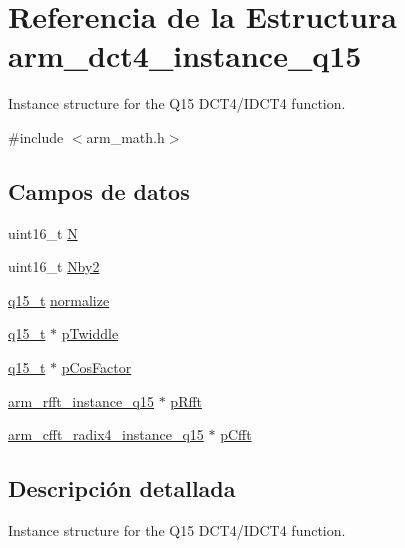 \hypertarget{structarm__dct4__instance__q15}{}\section{Referencia de la Estructura arm\+\_\+dct4\+\_\+instance\+\_\+q15}
\label{structarm__dct4__instance__q15}


Instance structure for the Q15 D\+C\+T4/\+I\+D\+C\+T4 function.  




{\ttfamily \#include $<$arm\+\_\+math.\+h$>$}

\subsection*{Campos de datos}
\begin{DoxyCompactItemize}
\item 
uint16\+\_\+t \hyperlink{structarm__dct4__instance__q15_a37d49571fe35012087153c093705cd11}{N}
\item 
uint16\+\_\+t \hyperlink{structarm__dct4__instance__q15_afa64b1618089e35c2b55cff71cb29715}{Nby2}
\item 
\hyperlink{arm__math_8h_ab5a8fb21a5b3b983d5f54f31614052ea}{q15\+\_\+t} \hyperlink{structarm__dct4__instance__q15_a8ba8c9fa75542dac82553fee982ccd3e}{normalize}
\item 
\hyperlink{arm__math_8h_ab5a8fb21a5b3b983d5f54f31614052ea}{q15\+\_\+t} $\ast$ \hyperlink{structarm__dct4__instance__q15_aa8c837c05b2c910342ab8f171d30dc02}{p\+Twiddle}
\item 
\hyperlink{arm__math_8h_ab5a8fb21a5b3b983d5f54f31614052ea}{q15\+\_\+t} $\ast$ \hyperlink{structarm__dct4__instance__q15_a9d858d313cbba67ceaef9704bc9c43b0}{p\+Cos\+Factor}
\item 
\hyperlink{structarm__rfft__instance__q15}{arm\+\_\+rfft\+\_\+instance\+\_\+q15} $\ast$ \hyperlink{structarm__dct4__instance__q15_aea6aa42c838f2b22c8c31e9e259b8d75}{p\+Rfft}
\item 
\hyperlink{structarm__cfft__radix4__instance__q15}{arm\+\_\+cfft\+\_\+radix4\+\_\+instance\+\_\+q15} $\ast$ \hyperlink{structarm__dct4__instance__q15_ae0ac7c3a89699793fc0dac960db7f056}{p\+Cfft}
\end{DoxyCompactItemize}


\subsection{Descripción detallada}
Instance structure for the Q15 D\+C\+T4/\+I\+D\+C\+T4 function. 

